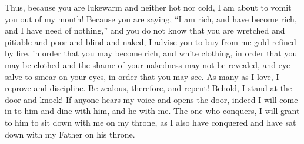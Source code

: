 \begin{biblechapter}
\verse Thus, because you are lukewarm and neither hot nor cold, I am about to vomit you out of my mouth!
\verse Because you are saying, “I am rich, and have become rich, and I have need of nothing,” and you do not know that you are wretched and pitiable and poor and blind and naked,
\verse I advise you to buy from me gold refined by fire, in order that you may become rich, and white clothing, in order that you may be clothed and the shame of your nakedness may not be revealed, and eye salve to smear on your eyes, in order that you may see.
\verse As many as I love, I reprove and discipline. Be zealous, therefore, and repent!
\verse Behold, I stand at the door and knock! If anyone hears my voice and opens the door, indeed I will come in to him and dine with him, and he with me.
\verse The one who conquers, I will grant to him to sit down with me on my throne, as I also have conquered and have sat down with my Father on his throne.
\end{biblechapter}

